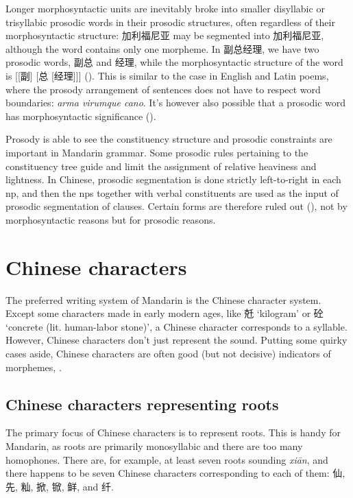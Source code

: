 \documentclass[UTF8, a4paper, oneside, scheme=plain, 12pt]{ctexrep}
\newcommand{\form}[1]{\emph{#1}}
\newcommand{\translate}[1]{`#1'}
\begin{document}
Longer morphosyntactic units are 
inevitably broke into smaller disyllabic or trisyllabic prosodic words
in their prosodic structures,
often regardless of their morphosyntactic structure:
加利福尼亚 may be segmented into 加利\textbar 福尼亚, 
although the word contains only one morpheme.
In 副总经理,
we have two prosodic words,
副总 and 经理,
while the morphosyntactic structure of the word is [[副] [总 [经理]]]
().
This is similar to the case in English and Latin poems,
where the prosody arrangement of sentences does not have to respect word boundaries:
\form{arma vi\textbar rumque ca\textbar no}.
It's however also possible that 
a prosodic word has morphosyntactic significance
().

Prosody is able to see the constituency structure
and prosodic constraints are important in Mandarin grammar.
Some prosodic rules pertaining to the constituency tree 
guide and limit the assignment of relative heaviness and lightness.
In Chinese, prosodic segmentation is done strictly left-to-right 
in each \ac{np},
and then the \ac{np}s together with verbal constituents 
are used as the input of prosodic segmentation of clauses.
Certain forms are therefore ruled out
(), 
not by morphosyntactic reasons but for prosodic reasons.

\section{Chinese characters}\label{sec:chinese-character}

The preferred writing system of Mandarin is the Chinese character system.
Except some characters made in early modern ages,
like 兛 \translate{kilogram} or 砼 \translate{concrete (lit. human-labor stone)},
a Chinese character corresponds to a syllable.
However, Chinese characters don't just represent the sound.
Putting some quirky cases aside,
Chinese characters are often good (but not decisive) indicators of morphemes,
\citep[1.1.4]{zhudexigrammar}.

\subsection{Chinese characters representing roots}

The primary focus of Chinese characters is to represent roots.
This is handy for Mandarin,
as roots are primarily monosyllabic and there are too many homophones.
There are, for example, at least seven roots sounding \form{xi\={a}n},
and there happens to be seven Chinese characters corresponding to each of them:
仙, 先, 籼, 掀, 锨, 鲜, and 纤.
\end{document}
